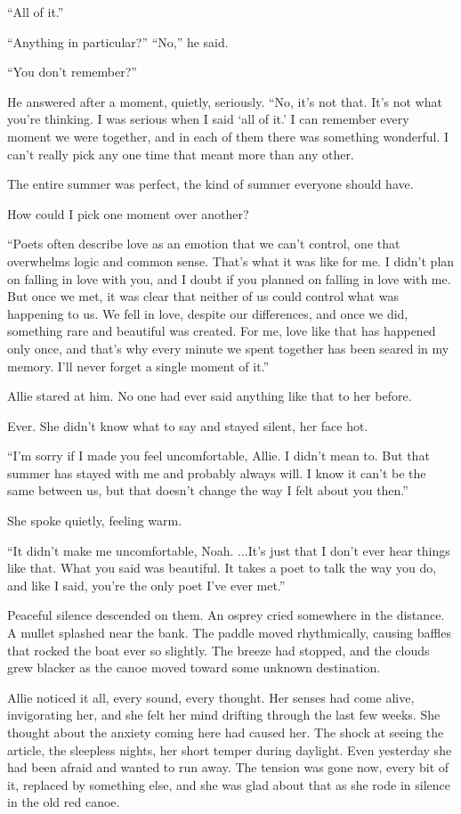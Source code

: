 \documentclass[10pt, twoside, openright]{book}
\begin{document}
``All of it.''

``Anything in particular?'' ``No,'' he said.

``You don't remember?''


He answered after a moment, quietly, seriously. ``No, it's not that.
It's not what you're thinking. I was serious when I said `all of it.' I
can remember every moment we were together, and in each of them there
was something wonderful. I can't really pick any one time that meant
more than any other.

The entire summer was perfect, the kind of summer everyone should have.

How could I pick one moment over another?

``Poets often describe love as an emotion that we can't control, one
that overwhelms logic and common sense. That's what it was like for me.
I didn't plan on falling in love with you, and I doubt if you planned on
falling in love with me. But once we met, it was clear that neither of
us could control what was happening to us. We fell in love, despite our
differences, and once we did, something rare and beautiful was created.
For me, love like that has happened only once, and that's why every
minute we spent together has been seared in my memory. I'll never forget
a single moment of it.''

Allie stared at him. No one had ever said anything like that to her
before.

Ever. She didn't know what to say and stayed silent, her face hot.

``I'm sorry if I made you feel uncomfortable, Allie. I didn't mean to.
But that summer has stayed with me and probably always will. I know it
can't be the same between us, but that doesn't change the way I felt
about you then.''


She spoke quietly, feeling warm.


``It didn't make me uncomfortable, Noah. ...It's just that I don't ever
hear things like that. What you said was beautiful. It takes a poet to
talk the way you do, and like I said, you're the only poet I've ever
met.''

Peaceful silence descended on them. An osprey cried somewhere in the
distance. A mullet splashed near the bank. The paddle moved
rhythmically, causing baffles that rocked the boat ever so slightly. The
breeze had stopped, and the clouds grew blacker as the canoe moved
toward some unknown destination.

Allie noticed it all, every sound, every thought. Her senses had come
alive, invigorating her, and she felt her mind drifting through the last
few weeks. She thought about the anxiety coming here had caused her. The
shock at seeing the article, the sleepless nights, her short temper
during daylight. Even yesterday she had been afraid and wanted to run
away. The tension was gone now, every bit of it, replaced by something
else, and she was glad about that as she rode in silence in the old red
canoe.
\end{document}
